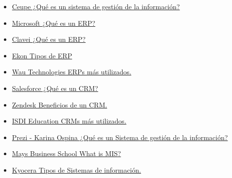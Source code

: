 \documentclass[
]{article}
\providecommand{\tightlist}{%
  \setlength{\itemsep}{0pt}\setlength{\parskip}{0pt}}
\begin{document}
\begin{itemize}
\tightlist
\item
  \href{https://www.ceupe.com/blog/que-es-un-sistema-de-gestion-de-informacion.html\#:~:text=El\%20sistema\%20de\%20gesti\%C3\%B3n\%20de,a\%20realizar\%20funciones\%20de\%20gesti\%C3\%B3n.}{Ceupe
  \textbar{} ¿Qué es un sistema de gestión de la información?}
\item
  \href{https://dynamics.microsoft.com/es-es/erp/define-erp/}{Microsoft
  \textbar{} ¿Qué es un ERP?}
\item
  \href{https://www.clavei.es/blog/erp-que-es/}{Clavei \textbar{} ¿Qué
  es un ERP?}
\item
  \href{https://www.ekon.es/tipos-de-erp/}{Ekon \textbar{} Tipos de ERP}
\item
  \href{https://wautechnologies.com/noticias/ranking-erp-mas-usados/}{Wau
  Technologies \textbar{} ERPs más utilizados.}
\item
  \href{https://www.salesforce.com/mx/crm/\#importancia-beneficios-scroll-tab}{Salesforce
  \textbar{} ¿Qué es un CRM?}
\item
  \href{https://www.zendesk.com.mx/blog/beneficios-de-un-crm/}{Zendesk
  \textbar{} Beneficios de un CRM.}
\item
  \href{https://www.isdi.education/es/blog/7-mejores-crm-momento}{ISDI
  Education \textbar{} CRMs más utilizados.}
\item
  \href{https://prezi.com/hjym-loeewht/mis-management-information-system/}{Prezi
  - Karina Ospina \textbar{} ¿Qué es un Sistema de gestión de la
  información?}
\item
  \href{https://mays.tamu.edu/department-of-information-and-operations-management/management-information-systems/}{Mays
  Business School \textbar{} What is MIS?}
\item
  \href{https://www.kyoceradocumentsolutions.es/es/smarter-workspaces/business-challenges/the-cloud/los-6-principales-tipos-sistemas-informacion.html}{Kyocera
  \textbar{} Tipos de Sistemas de información.}
\end{itemize}
\end{document}

